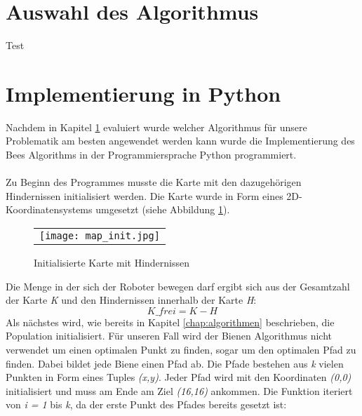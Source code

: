 \section{Auswahl des Algorithmus}
\label{sec:Auswahl}
Test

\section{Implementierung in Python}

Nachdem in Kapitel \ref{sec:Auswahl} evaluiert wurde welcher Algorithmus für unsere Problematik am besten angewendet werden kann wurde die Implementierung des \glqq Bees Algorithms\grqq{} in der Programmiersprache Python programmiert.\\\\
Zu Beginn des Programmes musste die Karte mit den dazugehörigen Hindernissen initialisiert werden. Die Karte wurde in Form eines 2D-Koordinatensystems umgesetzt (siehe Abbildung \ref{fig:map_init}).
\begin{figure}[H]
    \begin{tabular}{@{}r@{}} 
        \texttt{[image: map\_init.jpg]}
    \end{tabular}
    \caption{Initialisierte Karte mit Hindernissen\\}   
    \label{fig:map_init}
\end{figure}
Die Menge in der sich der Roboter bewegen darf ergibt sich aus der Gesamtzahl der Karte \emph{K} und den Hindernissen innerhalb der Karte \emph{H}:
\[K\_frei = K - H\]
Als nächstes wird, wie bereits in Kapitel \ref{chap:algorithmen} beschrieben, die Population initialisiert. Für unseren Fall wird der Bienen Algorithmus nicht verwendet um einen optimalen Punkt zu finden, sogar um den optimalen Pfad zu finden. Dabei bildet jede Biene einen Pfad ab. Die Pfade bestehen aus \emph{k} vielen Punkten in Form eines Tuples \emph{(x,y)}. Jeder Pfad wird mit den Koordinaten \emph{(0,0)} initialisiert und muss am Ende am Ziel \emph{(16,16)} ankommen. Die Funktion iteriert von \emph{i = 1} bis \emph{k}, da der erste Punkt des Pfades bereits gesetzt ist:
